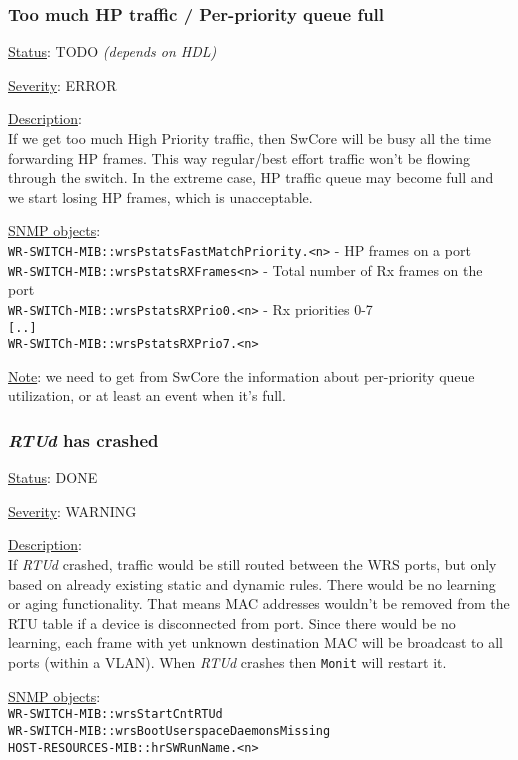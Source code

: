 \subsubsection{\bf Too much HP traffic / Per-priority queue full}
		\label{fail:data:too_much_HP}
		\begin{packed_enum}
			\item [] \underline{Status}: TODO \emph{(depends on HDL)}
			\item [] \underline{Severity}: ERROR
			\item [] \underline{Description}:\\
				If we get too much High Priority traffic, then SwCore will be busy all
				the time forwarding HP frames. This way regular/best effort traffic
				won't be flowing through the switch. In the extreme case, HP traffic
				queue may become full and we start losing HP frames, which is
				unacceptable.
			\item [] \underline{SNMP objects}:\\
				\texttt{WR-SWITCH-MIB::wrsPstatsFastMatchPriority.<n>} - HP frames on a port\\
				\texttt{WR-SWITCH-MIB::wrsPstatsRXFrames<n>} - Total number of Rx frames on
				the port\\
				\texttt{WR-SWITCh-MIB::wrsPstatsRXPrio0.<n>} - Rx priorities 0-7\\
				\texttt{[..]}\\
				\texttt{WR-SWITCh-MIB::wrsPstatsRXPrio7.<n>}
			\item [] \underline{Note}: we need to get from SwCore the information
				about per-priority queue utilization, or at least an event when it's
				full.
		\end{packed_enum}

\subsubsection{\bf \emph{RTUd} has crashed}
		\label{fail:data:rtu_crash}
		\begin{packed_enum}
			\item [] \underline{Status}: DONE
			\item [] \underline{Severity}: WARNING
			\item [] \underline{Description}:\\
				If \emph{RTUd} crashed, traffic would be still routed between the WRS ports, but
				only based on already existing static and dynamic rules. There would be
				no learning or aging functionality. That means MAC addresses wouldn't be
				removed from the RTU table if a device is disconnected from port. Since
				there would be no learning, each frame with yet unknown destination MAC
				will be broadcast to all ports (within a VLAN).
				When \emph{RTUd} crashes then \texttt{Monit} will restart it.
			\item [] \underline{SNMP objects}:\\
				\texttt{WR-SWITCH-MIB::wrsStartCntRTUd}\\
				\texttt{WR-SWITCH-MIB::wrsBootUserspaceDaemonsMissing}\\
				\texttt{HOST-RESOURCES-MIB::hrSWRunName.<n>}
		\end{packed_enum}


